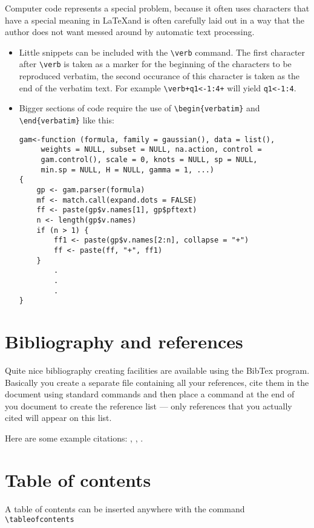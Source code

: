\documentclass[11pt,a4paper]{article}
\begin{document}
Computer code represents a special problem, because it often uses characters that have a special meaning in \LaTeX and is often carefully laid out in a way that the author does not want messed around by automatic text processing. 
\begin{itemize}
\item Little snippets can be included with the \verb+\verb+ command. The first character after \verb+\verb+ is taken as a marker for the beginning of the characters to be reproduced verbatim, the second occurance of this character is taken as the end of the verbatim text. For example \verb^\verb+q1<-1:4+^ will yield \verb+q1<-1:4+.
\item Bigger sections of code require the use of \verb+\begin{verbatim}+ and \verb+\end{verbatim}+ like this:
{\small
\begin{verbatim}
gam<-function (formula, family = gaussian(), data = list(), 
     weights = NULL, subset = NULL, na.action, control = 
     gam.control(), scale = 0, knots = NULL, sp = NULL, 
     min.sp = NULL, H = NULL, gamma = 1, ...) 
{
    gp <- gam.parser(formula)
    mf <- match.call(expand.dots = FALSE)
    ff <- paste(gp$v.names[1], gp$pftext)
    n <- length(gp$v.names)
    if (n > 1) {
        ff1 <- paste(gp$v.names[2:n], collapse = "+")
        ff <- paste(ff, "+", ff1)
    }
        .
        .
        .
}        

\end{verbatim}
}
\end{itemize}

\section{Bibliography and references}

Quite nice bibliography creating facilities are available using the BibTex program. Basically you create a separate file containing all your references, cite them in the document using standard commands and then place a command at the end of you document to create the reference list --- only references that you actually cited will appear on this list.

Here are some example citations: \cite{Wit01}, \cite{McCullagh00a,McCullagh00b}, \cite{Ward73,McCullagh89}.

\section{Table of contents}

A table of contents can be inserted anywhere with the command \verb+\tableofcontents+

\tableofcontents




\end{document}
